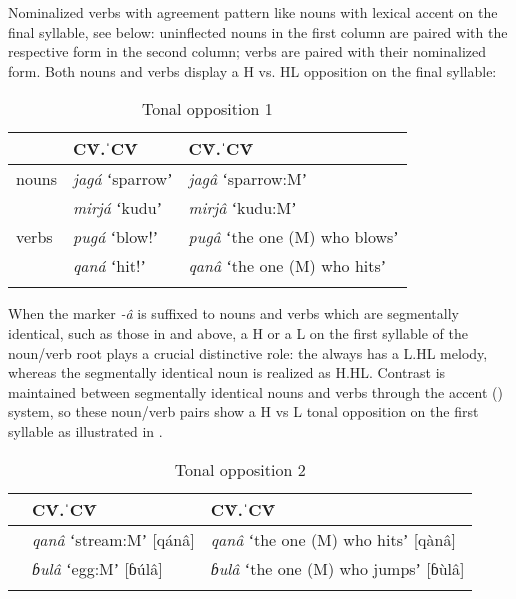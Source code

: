 \documentclass[output=paper,modfonts,nonflat,hidelinks]{langsci/langscibook}
\begin{document}
Nominalized verbs with  agreement pattern like nouns with lexical accent on the final syllable, see  below: uninflected nouns in the first column are paired with the respective  form in the second column; verbs are paired with their  nominalized form. Both nouns and verbs display a H vs. HL opposition on the final syllable:

\begin{table}
\caption{Tonal opposition 1}
\label{tab:Petrollino:4}
 \begin{tabular}{lll} 
  \lsptoprule
            & CV̀.ˈCV́ & CV̀.ˈCV̂\\ 
  \midrule
nouns		& \textit{jagá} ʻsparrowʼ & \textit{jagâ} ʻsparrow:Mʼ  \\
			& \textit{mirjá} ʻkuduʼ & \textit{mirjâ} ʻkudu:Mʼ\\ 
verbs		& \textit{pugá} ʻblow!ʼ & \textit{pugâ} ʻthe one (M) who blowsʼ \\
			& \textit{qaná} ʻhit!ʼ & \textit{qanâ} ʻthe one (M) who hitsʼ\\
  \lspbottomrule
 \end{tabular}
\end{table}
When the  marker \textit{-â} is suffixed to nouns and verbs which are segmentally identical, such as those in  and  above, a H or a L  on the first syllable of the noun/verb root plays a crucial distinctive role: the  always has a L.HL melody, whereas the segmentally identical  noun is realized as H.HL. Contrast is maintained between segmentally identical nouns and verbs through the accent () system, so these noun/verb pairs show a H vs L tonal opposition on the first syllable as illustrated in . 

\begin{table}
\caption{Tonal opposition 2}
\label{tab:Petrollino:5}
 \begin{tabular}{lll} 
  \lsptoprule
            & CV́.ˈCV̂ & CV̀.ˈCV̂\\ 
  \midrule
		& \textit{qanâ} ʻstream:Mʼ [qánâ] & \textit{qanâ} ʻthe one (M) who hitsʼ [qànâ]\\
		& \textit{ɓulâ} ʻegg:Mʼ [ɓúlâ] & \textit{ɓulâ} ʻthe one (M) who jumpsʼ [ɓùlâ]\\
  \lspbottomrule
 \end{tabular}
\end{table}
\end{document}

